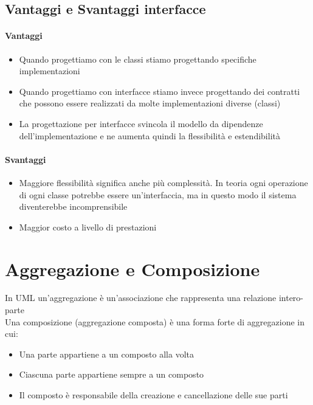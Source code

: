 \subsection*{Vantaggi e Svantaggi interfacce}
\paragraph*{Vantaggi}
\begin{itemize}
    \item Quando progettiamo con le classi stiamo progettando specifiche implementazioni
    \item Quando progettiamo con interfacce stiamo invece progettando dei contratti che possono
    essere realizzati da molte implementazioni diverse (classi)
    \item La progettazione per interfacce svincola il modello da dipendenze dell'implementazione e 
    ne aumenta quindi la flessibilità e estendibilità
\end{itemize}
\paragraph*{Svantaggi}
\begin{itemize}
    \item Maggiore flessibilità significa anche più complessità. In teoria ogni operazione
    di ogni classe potrebbe essere un'interfaccia, ma in questo modo il sistema diventerebbe
    incomprensibile
    \item Maggior costo a livello di prestazioni
\end{itemize}
\section{Aggregazione e Composizione}
In UML un'aggregazione è un'associazione che rappresenta una relazione intero-parte
\\ Una composizione (aggregazione composta) è una forma forte di aggregazione in cui:
\begin{itemize}
    \item Una parte appartiene a un composto alla volta
    \item Ciascuna parte appartiene sempre a un composto
    \item Il composto è responsabile della creazione e cancellazione delle sue parti
\end{itemize}
